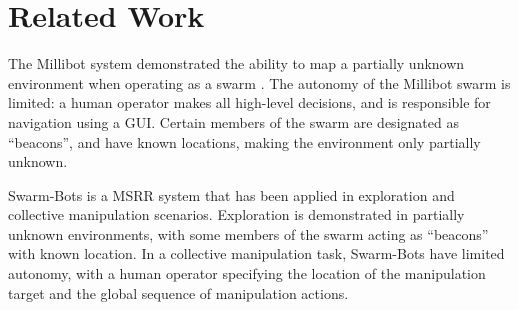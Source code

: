 \documentclass[journal]{IEEEtran}
\begin{document}



\section{Related Work}\label{sec:related-work}
%
%

The Millibot system demonstrated the ability to map a partially unknown environment when operating as a swarm \cite{Grabowski2000}. The autonomy of the Millibot swarm is limited: a human operator makes all high-level decisions, and is responsible for navigation using a GUI. Certain members of the swarm are designated as ``beacons'', and have known locations, making the environment only partially unknown.

Swarm-Bots is a MSRR system that has been applied in exploration \cite{Dorigo2005} and collective manipulation \cite{Mondada2005} scenarios.  Exploration is demonstrated in partially unknown environments, with some members of the swarm acting as ``beacons'' with known location.  In a collective manipulation task, Swarm-Bots have limited autonomy, with a human operator specifying the location of the manipulation target and the global sequence of manipulation actions.
\end{document}
